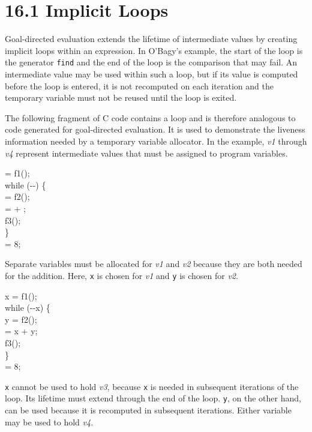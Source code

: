 \section[16.1 Implicit Loops]{16.1 Implicit Loops}

Goal-directed evaluation extends the lifetime of intermediate values
by creating implicit loops within an expression. In O'Bagy's example,
the start of the loop is the generator \texttt{find} and the end of
the loop is the comparison that may fail.  An intermediate value may
be used within such a loop, but if its value is computed before the
loop is entered, it is not recomputed on each iteration and the
temporary variable must not be reused until the loop is exited.

The following fragment of C code contains a loop and is therefore
analogous to code generated for goal-directed evaluation. It is used
to demonstrate the liveness information needed by a temporary variable
allocator. In the example, \textit{v1} through \textit{v4} represent
intermediate values that must be assigned to program variables.

\goodbreak
\begin{iconcode}
 = f1();\\
while (-{}-) \{\\
\> = f2();\\
\> =  + ;\\
\>f3();\\
\>\}\\
 = 8;\\
\end{iconcode}

Separate variables must be allocated for \textit{v1} and \textit{v2} because
they are both needed for the addition. Here, \texttt{x} is chosen for
\textit{v1} and \texttt{y} is chosen for \textit{v2}.

\goodbreak
\begin{iconcode}
x = f1();\\
while (-{}-x) \{\\
\>y = f2();\\
\> = x + y;\\
\>f3();\\
\>\}\\
 = 8;\\
\end{iconcode}



\texttt{x} cannot be used to hold \textit{v3}, because \texttt{x} is needed in
subsequent iterations of the loop. Its lifetime must extend through
the end of the loop. \texttt{y}, on the other hand, can be used because it is
recomputed in subsequent iterations.  Either variable may be used to
hold \textit{v4}.

